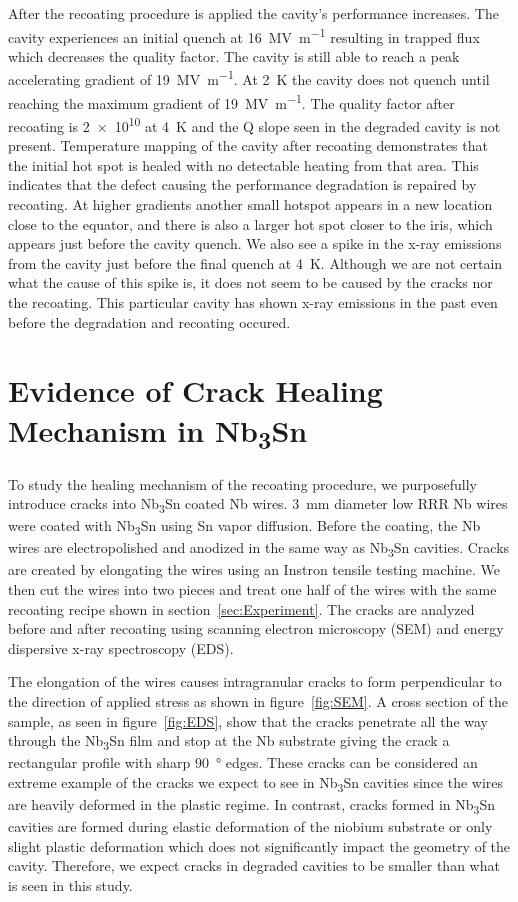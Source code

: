 After the recoating procedure is applied the cavity's performance increases. The cavity experiences an initial quench at \qty{16}{\mega\volt\per\meter} resulting in trapped flux which decreases the quality factor. The cavity is still able to reach a peak accelerating gradient of \qty{19}{\mega\volt\per\meter}. At \qty{2}{\kelvin} the cavity does not quench until reaching the maximum gradient of \qty{19}{\mega\volt\per\meter}. The quality factor after recoating is \num{2e10} at \qty{4}{\kelvin} and the Q slope seen in the degraded cavity is not present. Temperature mapping of the cavity after recoating demonstrates that the initial hot spot is healed with no detectable heating from that area. This indicates that the defect causing the performance degradation is repaired by recoating. At higher gradients another small hotspot appears in a new location close to the equator, and there is also a larger hot spot closer to the iris, which appears just before the cavity quench. We also see a spike in the x-ray emissions from the cavity just before the final quench at \qty{4}{\kelvin}. Although we are not certain what the cause of this spike is, it does not seem to be caused by the cracks nor the recoating. This particular cavity has shown x-ray emissions in the past even before the degradation and recoating occured.

\section{Evidence of Crack Healing Mechanism in Nb\textsubscript{3}Sn}

To study the healing mechanism of the recoating procedure, we purposefully introduce cracks into Nb\textsubscript{3}Sn coated Nb wires. \qty{3}{\milli\meter} diameter low RRR Nb wires were coated with Nb\textsubscript{3}Sn using Sn vapor diffusion. Before the coating, the Nb wires are electropolished and anodized in the same way as Nb\textsubscript{3}Sn cavities. Cracks are created by elongating the wires using an Instron tensile testing machine. We then cut the wires into two pieces and treat one half of the wires with the same recoating recipe shown in section~\ref{sec:Experiment}. The cracks are analyzed before and after recoating using scanning electron microscopy (SEM) and energy dispersive x-ray spectroscopy (EDS). 

The elongation of the wires causes intragranular cracks to form perpendicular to the direction of applied stress as shown in figure~\ref{fig:SEM}. A cross section of the sample, as seen in figure~\ref{fig:EDS}, show that the cracks penetrate all the way through the Nb\textsubscript{3}Sn film and stop at the Nb substrate giving the crack a rectangular profile with sharp \qty{90}{\degree} edges. These cracks can be considered an extreme example of the cracks we expect to see in Nb\textsubscript{3}Sn cavities since the wires are heavily deformed in the plastic regime. In contrast, cracks formed in Nb\textsubscript{3}Sn cavities are formed during elastic deformation of the niobium substrate or only slight plastic deformation which does not significantly impact the geometry of the cavity. Therefore, we expect cracks in degraded cavities to be smaller than what is seen in this study.

